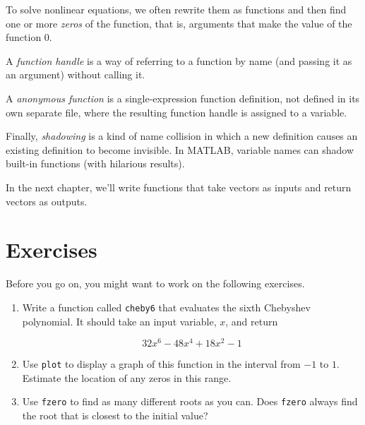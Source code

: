 To solve nonlinear equations, we often rewrite them as functions and then find one or more \emph{zeros} of the function, that is, arguments that make the value of the function $0$.

A \emph{function handle} is a way of
referring to a function by name (and passing it as an argument)
without calling it.

A \emph{anonymous function} is a single-expression function definition, not defined in its own separate file, where the resulting function handle is assigned to a variable.

Finally, \emph{shadowing} is a kind of name collision in which a new definition
causes an existing definition to become invisible.  In MATLAB,
variable names can shadow built-in functions (with hilarious results).

In the next chapter, we'll write functions that take vectors as inputs and return vectors as outputs.


\section{Exercises}

Before you go on, you might want to work on the following exercises.

\begin{ex}

\begin{enumerate}


\item Write a function called \lstinline{cheby6} that evaluates the
sixth Chebyshev polynomial.  It should take an input variable,
$x$, and return

\begin{equation*}
32 x^6 - 48 x^4 + 18 x^2 - 1
\end{equation*}

\item Use \lstinline{plot} to display a graph of this function in the
interval from $-1$ to $1$.  Estimate the location of any zeros in this
range.

\item Use \lstinline{fzero} to find as many different roots as you can.
Does \lstinline{fzero} always find the root that is closest to the initial
value?

\end{enumerate}

\end{ex}


